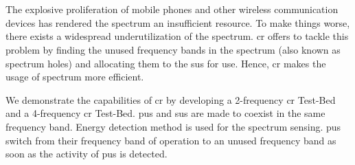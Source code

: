 \chapter*{}
The explosive proliferation of mobile phones and other wireless communication
devices has rendered the spectrum an insufficient resource. To make things
worse, there exists a widespread underutilization of the spectrum. \gls{cr}
offers to tackle this problem by finding the unused frequency bands
in the spectrum (also known as spectrum holes) and allocating them to the
\glspl{su} for use. Hence, \gls{cr} makes the usage of spectrum more
efficient.

We demonstrate the capabilities of \gls{cr} by developing a 2-frequency \gls{cr} Test-Bed
and a 4-frequency \gls{cr} Test-Bed. \glspl{pu} and \glspl{su} are made to
coexist in the same frequency band. Energy detection method is used for the
spectrum sensing. \glspl{pu} switch from their frequency band of operation to an
unused frequency band as soon as the activity of \glspl{pu} is detected.
